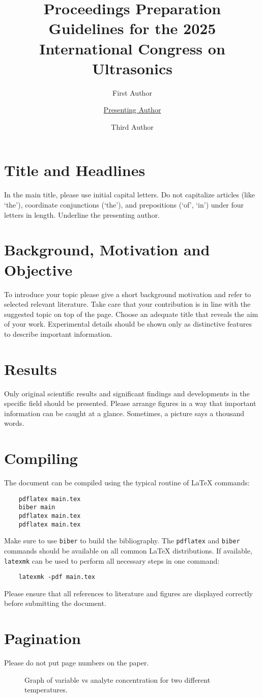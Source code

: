 \documentclass{ama}
\title{Proceedings Preparation Guidelines for the 2025 International Congress on Ultrasonics}
\author[1]{First Author}
\author[1]{\underline{Presenting Author}}
\author[2]{Third Author}
\affil[1]{Institution or company, address and country}
\affil[2]{Institution or company, address and country}
\begin{document}
\section{Title and Headlines}
In the main title, please use initial capital letters.
Do not capitalize articles (like `the'), coordinate conjunctions (`the'), and prepositions (`of', `in') under four letters in length.
Underline the presenting author.

\section{Background, Motivation and Objective}
To introduce your topic please give a short background motivation and refer to selected relevant literature.
Take care that your contribution is in line with the suggested topic on top of the page.
Choose an adequate title that reveals the aim of your work.
Experimental details should be shown only as distinctive features to describe important information.

\section{Results}
Only original scientific results and significant findings and developments in the specific field should be presented.
Please arrange figures in a way that important information can be caught at a glance.
Sometimes, a picture says a thousand words.

\section{Compiling}
The document can be compiled using the typical routine of \LaTeX{} commands:
%
\begin{verbatim}
    pdflatex main.tex
    biber main
    pdflatex main.tex
    pdflatex main.tex
\end{verbatim}
%
Make sure to use \texttt{biber} to build the bibliography.
The \texttt{pdflatex} and \texttt{biber} commands should be available on all common \LaTeX{} distributions.
If available, \texttt{latexmk} can be used to perform all necessary steps in one command:
%
\begin{verbatim}
    latexmk -pdf main.tex
\end{verbatim}
%
Please ensure that all references to literature and figures are displayed correctly before submitting the document.

\section{Pagination}
Please do not put page numbers on the paper.
%
\begin{figure}
    \centering
    
    \caption{Graph of variable vs analyte concentration for two different temperatures.}\label{fig:ex1}
\end{figure}
\end{document}
